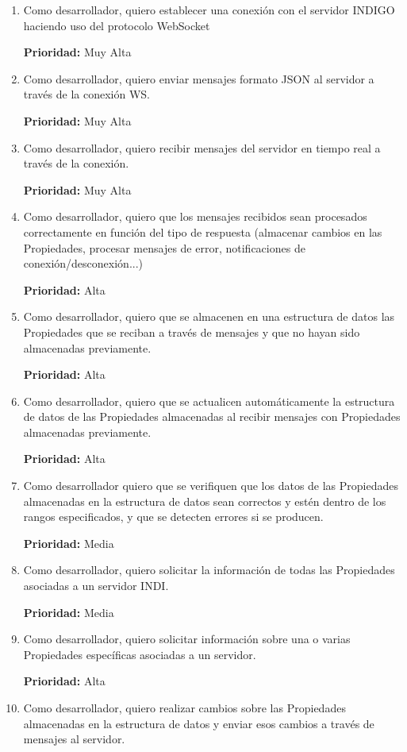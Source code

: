 \begin{enumerate}[label=\textbf{INDIGO.1.\arabic*}, leftmargin=10mm]
	\item Como desarrollador, quiero establecer una conexión con el servidor INDIGO haciendo uso del protocolo WebSocket
	
	\textbf{Prioridad:} Muy Alta
	\item Como desarrollador, quiero enviar mensajes formato JSON al servidor a través de la conexión WS.
	
	\textbf{Prioridad:} Muy Alta
	\item Como desarrollador, quiero recibir mensajes del servidor en tiempo real a través de la conexión.
	
	\textbf{Prioridad:} Muy Alta

	\item Como desarrollador, quiero que los mensajes recibidos sean procesados correctamente en función del tipo de respuesta (almacenar cambios en las Propiedades, procesar mensajes de error, notificaciones de conexión/desconexión...)
	
	\textbf{Prioridad:} Alta

	\item Como desarrollador, quiero que se almacenen en una estructura de datos las Propiedades que se reciban a través de mensajes y que no hayan sido almacenadas previamente.
	
	\textbf{Prioridad:} Alta
	\item Como desarrollador, quiero que se actualicen automáticamente la estructura de datos de las Propiedades almacenadas al recibir mensajes con Propiedades almacenadas previamente.
	
	\textbf{Prioridad:} Alta
	\item Como desarrollador quiero que se verifiquen que los datos de las Propiedades almacenadas en la estructura de datos sean correctos y estén dentro de los rangos especificados, y que se detecten errores si se producen.
	
	\textbf{Prioridad:} Media

	\item Como desarrollador, quiero solicitar la información de todas las Propiedades asociadas a un servidor INDI.
	
	\textbf{Prioridad:} Media
	\item Como desarrollador, quiero solicitar información sobre una o varias Propiedades específicas asociadas a un servidor.
	
	\textbf{Prioridad:} Alta
	\item Como desarrollador, quiero realizar cambios sobre las Propiedades almacenadas en la estructura de datos y enviar esos cambios a través de mensajes al servidor.
	

\end{enumerate}
